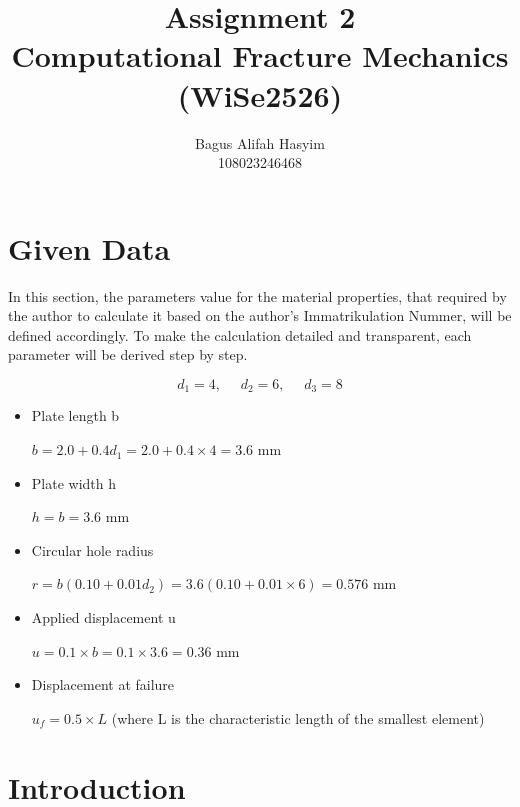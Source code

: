 \documentclass[12pt]{article}
\title{Assignment 2 \\ \large Computational Fracture Mechanics (WiSe2526)}
\author{Bagus Alifah Hasyim \\ 108023246468}
\date{}
\begin{document}
\maketitle

\section*{Given Data}
\hspace{1em}In this section, the parameters value for the material properties, 
that required by the author to calculate it based on the author's Immatrikulation Nummer, will be defined accordingly. To make
the calculation detailed and transparent, each parameter will be derived step by step. 

\begin{equation}
    d_1 = 4, \text{   }\text{   } d_2 = 6, \text{   }\text{   } d_3 = 8
\end{equation}

\vspace{1em}
\begin{tcolorbox}[title=Parameter for 1st question]
  \begin{itemize}
    \item Plate length b
    
    $b = 2.0 + 0.4d_1 = 2.0 + 0.4 \times 4 = 3.6 \text{ mm}$

    \item Plate width h 
    
    $h = b = 3.6 \text{ mm}$
    
    \item Circular hole radius 
    
    $r = b(0.10 + 0.01d_2) = 3.6(0.10 + 0.01 \times 6) = 0.576 \text{ mm}$
    
    \item Applied displacement u 
    
    $u = 0.1 \times b = 0.1 \times 3.6 = 0.36 \text{ mm}$ 
    
    \item Displacement at failure 
    
    $u_f = 0.5 \times L $ (where L is the characteristic length of the smallest element) 
\end{itemize}
\end{tcolorbox}


\section{Introduction}
\end{document}
